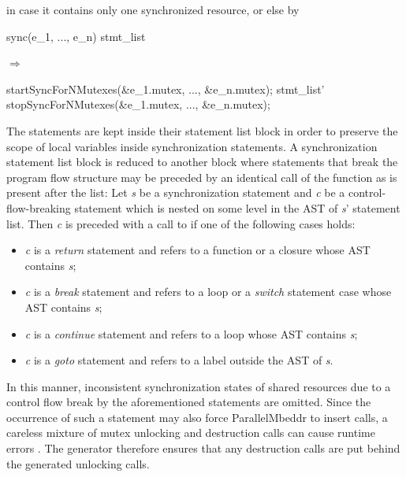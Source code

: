 in case it contains only one synchronized resource, or else by

\begin{center}
\begin{minipage}{0.3\textwidth}
\begin{ccode}
sync(e_1, ..., e_n) stmt_list
\end{ccode}
\end{minipage}
\qquad$\Longrightarrow$\qquad\qquad\qquad
\begin{minipage}{0.4\textwidth}
\begin{ccode}
startSyncForNMutexes(&e_1.mutex, ..., &e_n.mutex);
stmt_list'
stopSyncForNMutexes(&e_1.mutex, ..., &e_n.mutex);
\end{ccode}
\end{minipage}
\end{center}

The statements are kept inside their statement list block in order to preserve the scope of local variables inside synchronization statements. A synchronization statement list block is reduced to another block where statements that break the program flow structure may be preceded by an identical call of the  function as is present after the list: Let \textit{s} be a synchronization statement and \textit{c} be a control-flow-breaking statement which is nested on some level in the AST of \textit{s}' statement list. Then \textit{c} is preceded with a call to  if one of the following cases holds:
\begin{itemize}
\item \textit{c} is a \textit{return} statement and refers to a function or a closure whose AST contains \textit{s};
\item \textit{c} is a \textit{break} statement and refers to a loop or a \textit{switch} statement case whose AST contains \textit{s};
\item \textit{c} is a \textit{continue} statement and refers to a loop whose AST contains \textit{s};
\item \textit{c} is a \textit{goto} statement and refers to a label outside the AST of \textit{s}.
\end{itemize}

In this manner, inconsistent synchronization states of shared resources due to a control flow break by the aforementioned statements are omitted. Since the occurrence of such a statement may also force ParallelMbeddr to insert  calls, a careless mixture of mutex unlocking and destruction calls can cause runtime errors \cite{Mutexes}. The generator therefore ensures that any destruction calls are put behind the generated unlocking calls.


